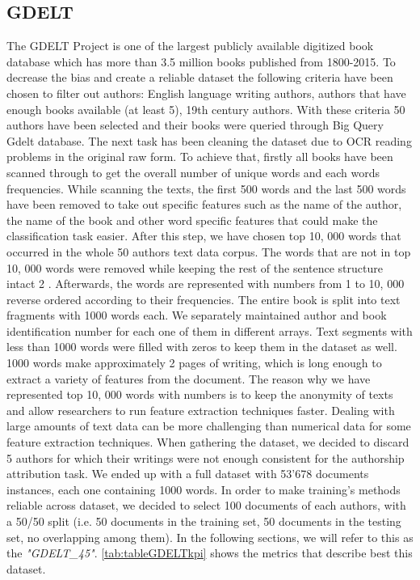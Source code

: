 \subsection{GDELT}
The GDELT Project is one of the largest publicly available digitized book database
which has more than 3.5 million books published from 1800-2015.
To decrease the bias and create a reliable dataset the following criteria have been
chosen to filter out authors: English language writing authors, authors that have
enough books available (at least 5), 19th century authors. With these criteria 50
authors have been selected and their books were queried through Big Query Gdelt
database. The next task has been cleaning the dataset due to OCR reading problems
in the original raw form. To achieve that, firstly all books have been scanned through
to get the overall number of unique words and each words frequencies. While scanning
the texts, the first 500 words and the last 500 words have been removed to take out
specific features such as the name of the author, the name of the book and other word
specific features that could make the classification task easier. After this step, we have
chosen top 10, 000 words that occurred in the whole 50 authors text data corpus. The
words that are not in top 10, 000 words were removed while keeping the rest of the
sentence structure intact 2 . Afterwards, the words are represented with numbers from
1 to 10, 000 reverse ordered according to their frequencies. The entire book is split
into text fragments with 1000 words each. We separately maintained author and
book identification number for each one of them in different arrays. Text segments
with less than 1000 words were filled with zeros to keep them in the dataset as well.
1000 words make approximately 2 pages of writing, which is long enough to extract a variety of features from the document. The reason why we have represented top
10, 000 words with numbers is to keep the anonymity of texts and allow researchers
to run feature extraction techniques faster. Dealing with large amounts of text data
can be more challenging than numerical data for some feature extraction techniques.
When gathering the dataset, we decided to discard 5 authors for which their writings were not enough consistent for the authorship attribution task.
We ended up with a full dataset with 53'678 documents instances, each one containing 1000 words.
In order to make training's methods reliable across dataset, we decided to select 100 documents of each authors, with a 50/50 split (i.e. 50 documents in the training set, 50 documents in the testing set, no overlapping among them). In the following sections, we will refer to this as the \textit{"GDELT\_45"}.
\autoref{tab:tableGDELTkpi} shows the metrics that describe best this dataset.

